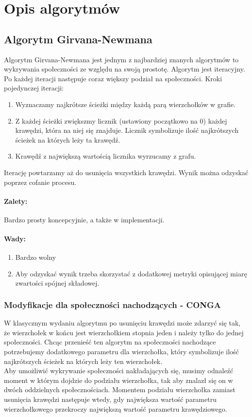 \documentclass{article}
\begin{document}
\section{Opis algorytmów}

\subsection{Algorytm Girvana-Newmana}
Algorytm Girvana-Newmana jest jednym z najbardziej znanych algorytmów to wykrywania społeczności ze względu na swoją prostotę. Algorytm jest iteracyjny. Po każdej iteracji następuje coraz większy podział na społeczności.
Kroki pojedynczej iteracji:
\begin{enumerate}
    \item Wyznaczamy najkrótsze ścieżki między każdą parą wierzchołków w grafie.
    \item Z każdej ścieżki zwiększmy licznik (ustawiony początkowo na 0) każdej krawędzi, która na niej się znajduje. Licznik symbolizuje ilość najkrótszych ścieżek na których leży ta krawędź.
    \item Krawędź z największą wartością licznika wyrzucamy z grafu.
\end{enumerate}
Iterację powtarzamy aż do usunięcia wszystkich krawędzi.
Wynik można odzyskać poprzez cofanie procesu.

\paragraph{Zalety:}
Bardzo prosty koncepcyjnie, a także w implementacji.
\paragraph{Wady:}
\begin{enumerate}
    \item Bardzo wolny
    \item Aby odzyskać wynik trzeba skorzystać z dodatkowej metryki opisującej miarę zwartości spójnej składowej.
\end{enumerate}



\subsubsection{Modyfikacje dla społeczności nachodzących - CONGA}

W klasycznym wydaniu algorytmu po usunięciu krawędzi może zdarzyć się tak, że wierzchołek w końcu jest wierzchołkiem stopnia jeden i należy tylko do jednej społeczności. Chcąc przenieść ten algorytm na społeczności nachodzące potrzebujemy dodatkowego parametru dla wierzchołka, który symbolizuje ilość najkrótszych ścieżek na których leży ten wierzchołek.
\\
Aby umożliwić wykrywanie społeczności nakładających się, musimy odnaleźć moment w którym dojdzie do podziału wierzchołka,
tak aby znalazł się on w dwóch oddzielnych społecznościach. Momentem podziału
wierzchołka zamiast usunięcia krawędzi
następuje wtedy, gdy największa wartość parametru wierzchołkowego przekroczy największą wartość parametru krawędziowego.
\end{document}

